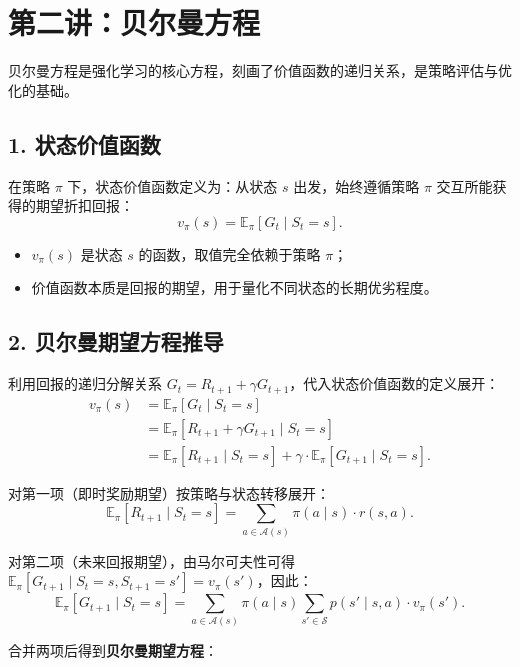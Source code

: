 \documentclass[UTF8]{article}
\begin{document}
\newpage

\section{第二讲：贝尔曼方程}

贝尔曼方程是强化学习的核心方程，刻画了价值函数的递归关系，是策略评估与优化的基础。

\subsection*{1. 状态价值函数}
在策略 $\pi$ 下，状态价值函数定义为：从状态 $s$ 出发，始终遵循策略 $\pi$ 交互所能获得的期望折扣回报：
\[
  v_\pi(s) = \mathbb{E}_\pi\left[ G_t \mid S_t = s \right].
\]
\begin{itemize}
  \item $v_\pi(s)$ 是状态 $s$ 的函数，取值完全依赖于策略 $\pi$；
  \item 价值函数本质是回报的期望，用于量化不同状态的长期优劣程度。
\end{itemize}

\subsection*{2. 贝尔曼期望方程推导}
利用回报的递归分解关系 $G_t = R_{t+1} + \gamma G_{t+1}$，代入状态价值函数的定义展开：
\begin{align*}
  v_\pi(s) &= \mathbb{E}_\pi\left[ G_t \mid S_t = s \right] \\
           &= \mathbb{E}_\pi\left[ R_{t+1} + \gamma G_{t+1} \mid S_t = s \right] \\
           &= \mathbb{E}_\pi\left[ R_{t+1} \mid S_t = s \right] + \gamma \cdot \mathbb{E}_\pi\left[ G_{t+1} \mid S_t = s \right].
\end{align*}

对第一项（即时奖励期望）按策略与状态转移展开：
\[
  \mathbb{E}_\pi\left[ R_{t+1} \mid S_t = s \right] = \sum_{a \in \mathcal{A}(s)} \pi(a \mid s) \cdot r(s,a).
\]

对第二项（未来回报期望），由马尔可夫性可得 $\mathbb{E}_\pi\left[ G_{t+1} \mid S_t=s, S_{t+1}=s' \right] = v_\pi(s')$，因此：
\[
  \mathbb{E}_\pi\left[ G_{t+1} \mid S_t = s \right] = \sum_{a \in \mathcal{A}(s)} \pi(a \mid s) \sum_{s' \in \mathcal{S}} p(s' \mid s,a) \cdot v_\pi(s').
\]

合并两项后得到\textbf{贝尔曼期望方程}：
\end{document}
